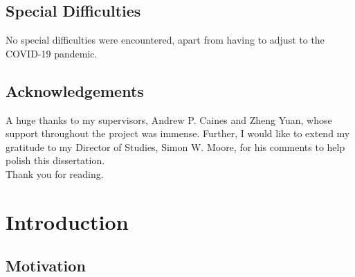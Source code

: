 \documentclass[12pt,a4paper,twoside,openright]{report}
\newcommand{\red}[1]{\textcolor{red}{#1}}
\begin{document}
\newpage
\section*{Special Difficulties}
No special difficulties were encountered, apart from having to adjust to the COVID-19 pandemic.



\section*{Acknowledgements}

A huge thanks to my supervisors, Andrew P. Caines and Zheng Yuan, whose support throughout the project was  immense. Further, I would like to extend my gratitude to my Director
 of Studies, Simon W. Moore, for his comments to help polish this dissertation.
\\
Thank you for reading.

\tableofcontents

\listoffigures




\pagestyle{headings}

\cleardoublepage{}



\chapter{Introduction}
\label{intro}



\section{Motivation}
\label{motivation}
\end{document}
